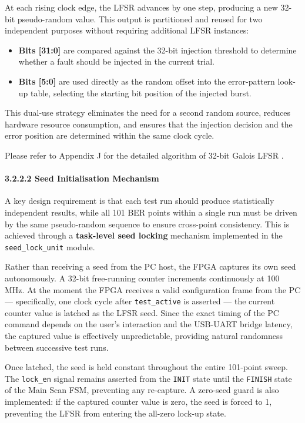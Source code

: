 At each rising clock edge, the LFSR advances by one step, producing a
new 32-bit pseudo-random value. This output is partitioned and reused
for two independent purposes without requiring additional LFSR
instances:

\begin{itemize}
\tightlist
\item
  \textbf{Bits {[}31:0{]}} are compared against the 32-bit injection
  threshold to determine whether a fault should be injected in the
  current trial.
\item
  \textbf{Bits {[}5:0{]}} are used directly as the random offset into
  the error-pattern look-up table, selecting the starting bit position
  of the injected burst.
\end{itemize}

This dual-use strategy eliminates the need for a second random source,
reduces hardware resource consumption, and ensures that the injection
decision and the error position are determined within the same clock
cycle.

Please refer to Appendix J for the detailed algorithm of 32-bit Galois
LFSR .

\paragraph{3.2.2.2 Seed Initialisation
Mechanism}\label{seed-initialisation-mechanism}

A key design requirement is that each test run should produce
statistically independent results, while all 101 BER points within a
single run must be driven by the same pseudo-random sequence to ensure
cross-point consistency. This is achieved through a \textbf{task-level
seed locking} mechanism implemented in the \texttt{seed\_lock\_unit}
module.

Rather than receiving a seed from the PC host, the FPGA captures its own
seed autonomously. A 32-bit free-running counter increments continuously
at 100 MHz. At the moment the FPGA receives a valid configuration frame
from the PC --- specifically, one clock cycle after
\texttt{test\_active} is asserted --- the current counter value is
latched as the LFSR seed. Since the exact timing of the PC command
depends on the user's interaction and the USB-UART bridge latency, the
captured value is effectively unpredictable, providing natural
randomness between successive test runs.

Once latched, the seed is held constant throughout the entire 101-point
sweep. The \texttt{lock\_en} signal remains asserted from the
\texttt{INIT} state until the \texttt{FINISH} state of the Main Scan
FSM, preventing any re-capture. A zero-seed guard is also implemented:
if the captured counter value is zero, the seed is forced to 1,
preventing the LFSR from entering the all-zero lock-up state.

